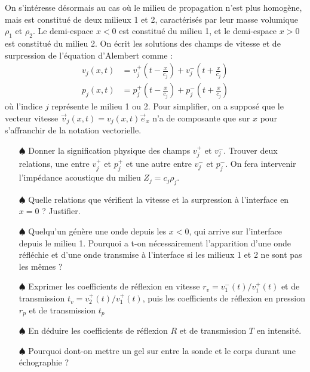 \documentclass{report}
\begin{document}
On s'intéresse désormais au cas où le milieu de propagation n'est plus homogène, mais est constitué de deux milieux 1 et 2, caractérisés par leur masse volumique $\rho_1$ et $\rho_2$. Le demi-espace $x<0$ est constitué du milieu 1, et le demi-espace $x>0$ est constitué du milieu 2. On écrit les solutions des champs de vitesse et de surpression de l'équation d'Alembert comme : 
\begin{align*}
	v_j(x,t)&=v^+_{j}\left( t-\frac{x}{c_j}\right) + v^-_{j}\left( t+\frac{x}{c_j}\right) \\
	p_j(x,t)&=p^+_{j}\left( t-\frac{x}{c_j}\right) + p^-_{j}\left( t+\frac{x}{c_j}\right) 
\end{align*}
où l'indice $j$ représente le milieu 1 ou 2. Pour simplifier, on a supposé que le vecteur vitesse $\vec{v}_j(x,t)=v_j(x,t)\vec{e}_x$ n'a de composante que sur $x$ pour s'affranchir de la notation vectorielle. 

\begin{itemize}
	
	\item[$\spadesuit$] Donner la signification physique des champs $v^+_{j}$ et $v^-_{j}$. Trouver deux relations, une entre $v^+_{j}$ et $p^+_{j}$ et une autre entre $v^-_{j}$ et $p^-_{j}$. On fera intervenir l'impédance acoustique du milieu $Z_j=c_j\rho_j$.
	
	\item[$\spadesuit$] Quelle relations que vérifient la vitesse et la surpression à l'interface en $x=0$ ? Justifier. 
	
	\item[$\spadesuit$] Quelqu'un génère une onde depuis les $x<0$, qui arrive sur l'interface depuis le milieu 1. Pourquoi a t-on nécessairement l'apparition d'une onde réfléchie et d'une onde transmise à l'interface si les milieux 1 et 2 ne sont pas les mêmes ?
	
	\item[$\spadesuit$] Exprimer les coefficients de réflexion en vitesse $r_v=v_1^-(t)/v_1^+(t)$ et de transmission $t_v=v_2^+(t)/v_1^+(t)$, puis les coefficients de réflexion en pression $r_p$ et de transmission $t_p$
	
	\item[$\spadesuit$]	 En déduire les coefficients de réflexion $R$ et de transmission $T$ en intensité. 
	
	\item[$\spadesuit$] Pourquoi dont-on mettre un gel sur entre la sonde et le corps durant une échographie ? 
		
\end{itemize}
\end{document}
